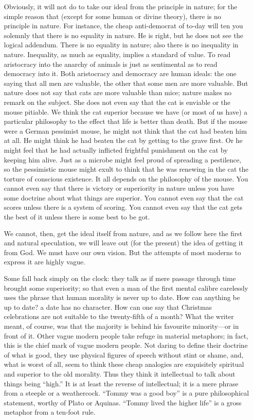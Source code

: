 \documentclass{book}
\begin{document}
Obviously, it will not do to take our ideal from the principle in nature; for the simple reason that (except for some human or divine theory), there is no principle in nature. For instance, the cheap anti-democrat of to-day will ten you solemnly that there is no equality in nature. He is right, but he does not see the logical addendum. There is no equality in nature; also there is no inequality in nature. Inequality, as much as equality, implies a standard of value. To read aristocracy into the anarchy of animals is just as sentimental as to read democracy into it. Both aristocracy and democracy are human ideals: the one saying that all men are valuable, the other that some men are more valuable. But nature does not say that cats are more valuable than mice; nature makes no remark on the subject. She does not even say that the cat is enviable or the mouse pitiable. We think the cat superior because we have (or most of us have) a particular philosophy to the effect that life is better than death. But if the mouse were a German pessimist mouse, he might not think that the cat had beaten him at all. He might think he had beaten the cat by getting to the grave first. Or he might feel that he had actually inflicted frightful punishment on the cat by keeping him alive. Just as a microbe might feel proud of spreading a pestilence, so the pessimistic mouse might exult to think that he was renewing in the cat the torture of conscious existence. It all depends on the philosophy of the mouse. You cannot even say that there is victory or superiority in nature unless you have some doctrine about what things are superior. You cannot even say that the cat scores unless there is a system of scoring. You cannot even say that the cat gets the best of it unless there is some best to be got.

We cannot, then, get the ideal itself from nature, and as we follow here the first and natural speculation, we will leave out (for the present) the idea of getting it from God. We must have our own vision. But the attempts of most moderns to express it are highly vague.

Some fall back simply on the clock: they talk as if mere passage through time brought some superiority; so that even a man of the first mental calibre carelessly uses the phrase that human morality is never up to date. How can anything be up to date? a date has no character. How can one say that Christmas celebrations are not suitable to the twenty-fifth of a month? What the writer meant, of course, was that the majority is behind his favourite minority—or in front of it. Other vague modern people take refuge in material metaphors; in fact, this is the chief mark of vague modern people. Not daring to define their doctrine of what is good, they use physical figures of speech without stint or shame, and, what is worst of all, seem to think these cheap analogies are exquisitely spiritual and superior to the old morality. Thus they think it intellectual to talk about things being “high.” It is at least the reverse of intellectual; it is a mere phrase from a steeple or a weathercock. “Tommy was a good boy” is a pure philosophical statement, worthy of Plato or Aquinas. “Tommy lived the higher life” is a gross metaphor from a ten-foot rule.
\end{document}
